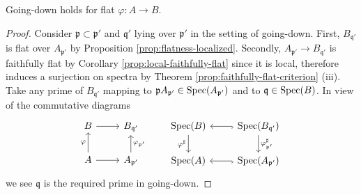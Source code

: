 \begin{theorem}\label{prop:going-down-flat}
	Going-down holds for flat $\varphi: A \to B$.
\end{theorem}
\begin{proof}
	Consider $\mathfrak{p} \subset \mathfrak{p}'$ and $\mathfrak{q}'$ lying over $\mathfrak{p}'$ in the setting of going-down. First, $B_{\mathfrak{q}'}$ is flat over $A_{\mathfrak{p}'}$ by Proposition \ref{prop:flatness-localized}. Secondly, $A_{\mathfrak{p}'} \to B_{\mathfrak{q}'}$ is faithfully flat by Corollary \ref{prop:local-faithfully-flat} since it is local, therefore induces a surjection on spectra by Theorem \ref{prop:faithfully-flat-criterion} (iii). Take any prime of $B_{\mathfrak{q}'}$ mapping to $\mathfrak{p}A_{\mathfrak{p}'} \in \operatorname{Spec}(A_{\mathfrak{p}'})$ and to $\mathfrak{q} \in \operatorname{Spec}(B)$. In view of the commutative diagrams
	\[\begin{tikzcd}
		B \arrow[r] & B_{\mathfrak{q}'} \\
		A \arrow[u, "\varphi"] \arrow[r] & A_{\mathfrak{p}'} \arrow[u, "\varphi_{\mathfrak{p}'}"']
	\end{tikzcd} \qquad \begin{tikzcd}
		\Spec(B) \arrow[d, "\varphi^\sharp"'] & \Spec(B_{\mathfrak{q}'}) \arrow[d, "\varphi_{\mathfrak{p}'}^\sharp"] \arrow[hookrightarrow, l] \\
		\Spec(A) & \Spec(A_{\mathfrak{p}'}) \arrow[hookrightarrow, l]
	\end{tikzcd}\]
	we see $\mathfrak{q}$ is the required prime in going-down.
\end{proof}

